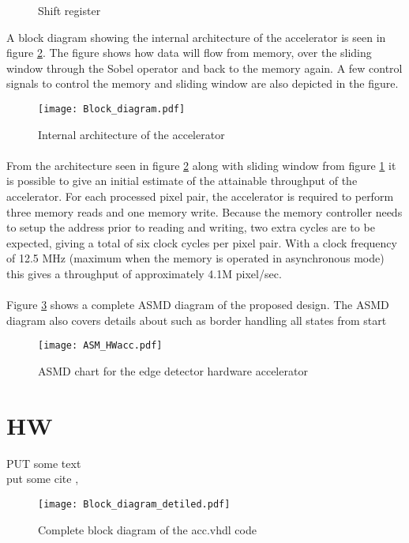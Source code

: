 \begin{figure}[H]
	\centering
	\caption{Shift register}
	\label{fig:shift_register}
\end{figure}

A block diagram showing the internal architecture of the accelerator is seen in figure \ref{fig:AccBlockDiagram}. The figure shows how data will flow from memory, over the sliding window through the Sobel operator and back to the memory again. A few control signals to control the memory and sliding window are also depicted in the figure. 

\begin{figure}[H]
	\centering
	\texttt{[image: Block\_diagram.pdf]}
	\caption{Internal architecture of the accelerator}
	\label{fig:AccBlockDiagram}
\end{figure}

\paragraph*{}
From the architecture seen in figure \ref{fig:AccBlockDiagram} along with sliding window from figure \ref{fig:shift_register} it is possible to give an initial estimate of the attainable throughput of the accelerator. For each processed pixel pair, the accelerator is required to perform three memory reads and one memory write. Because the memory controller needs to setup the address prior to reading and writing, two extra cycles are to be expected, giving a total of six clock cycles per pixel pair.
With a clock frequency of 12.5 MHz (maximum when the memory is operated in asynchronous mode) this gives a throughput of approximately 4.1M pixel/sec.

\paragraph*{}
Figure \ref{fig:ASM_HW} shows a complete ASMD diagram of the proposed design. The ASMD diagram also covers details about such as border handling all states from start 

\begin{figure}[H]
	\centering
	\texttt{[image: ASM\_HWacc.pdf]}
	\caption{ASMD chart for the edge detector hardware accelerator}
	\label{fig:ASM_HW}
\end{figure}

\section{HW}
\label{sec:hw}
PUT some text\\
put some cite \cite[p.11~eq.2.6]{Book}, \cite[p.11~eq.2.6]{Note}

\begin{figure}[H]
	\centering
	\texttt{[image: Block\_diagram\_detiled.pdf]}
	\caption{Complete block diagram of the acc.vhdl code}
	\label{fig:block_acc}
\end{figure}